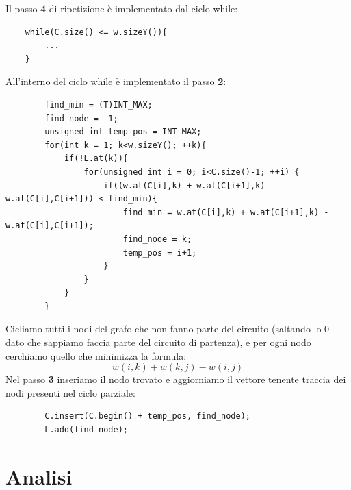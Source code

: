 \documentclass[]{article}
\begin{document}
\begin{flushleft}
Il passo \textbf{4} di ripetizione è implementato dal ciclo while:
\lstset{language=c++, style=mystyle, firstnumber=14}
\begin{lstlisting}
    while(C.size() <= w.sizeY()){
   	    ...    
    }
\end{lstlisting}
All'interno del ciclo while è implementato il passo \textbf{2}:
\lstset{language=c++, style=mystyle, firstnumber=15}
\begin{lstlisting}
        find_min = (T)INT_MAX;
        find_node = -1;
        unsigned int temp_pos = INT_MAX;
        for(int k = 1; k<w.sizeY(); ++k){
            if(!L.at(k)){
                for(unsigned int i = 0; i<C.size()-1; ++i) {
                    if((w.at(C[i],k) + w.at(C[i+1],k) - w.at(C[i],C[i+1])) < find_min){
                        find_min = w.at(C[i],k) + w.at(C[i+1],k) - w.at(C[i],C[i+1]);
                        find_node = k;
                        temp_pos = i+1;
                    }
                }
            }
        }
\end{lstlisting}
Cicliamo tutti i nodi del grafo che non fanno parte del circuito (saltando lo 0 dato che sappiamo faccia parte del circuito di partenza), e per ogni nodo cerchiamo quello che minimizza la formula: 
$$w(i,k)+w(k,j)-w(i,j)$$
Nel passo \textbf{3} inseriamo il nodo trovato e aggiorniamo il vettore tenente traccia dei nodi presenti nel ciclo parziale:
\lstset{language=c++, style=mystyle, firstnumber=29}
\begin{lstlisting}
        C.insert(C.begin() + temp_pos, find_node);
        L.add(find_node);
\end{lstlisting}

\end{flushleft}
\newpage
\section{Analisi}
\end{document}
